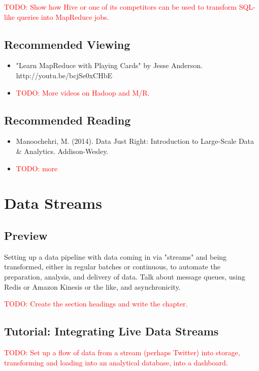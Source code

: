 \documentclass[11pt]{book}
\newcommand{\todo}[1]{\textcolor{red}{TODO: #1}} %
\begin{document}
\todo{Show how Hive or one of its competitors can be used to transform SQL-like queries into MapReduce jobs.}

\section*{Recommended Viewing}
\begin{itemize}
    \item "Learn MapReduce with Playing Cards" by Jesse Anderson.\\  http://youtu.be/bcjSe0xCHbE
    \item \todo{More videos on Hadoop and M/R.}
\end{itemize}

\section*{Recommended Reading}
\begin{itemize}
    \item Manoochehri, M. (2014). Data Just Right: Introduction to Large-Scale Data \& Analytics. Addison-Wesley.
    \item \todo{more}
\end{itemize}








\chapter{Data Streams}

\section*{Preview}

Setting up a data pipeline with data coming in via "streams" and being transformed, either in regular batches or continuous, to automate the preparation, analysis, and delivery of data.  Talk about message queues, using Redis or Amazon Kinesis or the like, and asynchronicity.

\todo{Create the section headings and write the chapter.}

\section{Tutorial: Integrating Live Data Streams}

\todo{Set up a flow of data from a stream (perhaps Twitter) into storage, transforming and loading into an analytical database, into a dashboard.}
\end{document}
